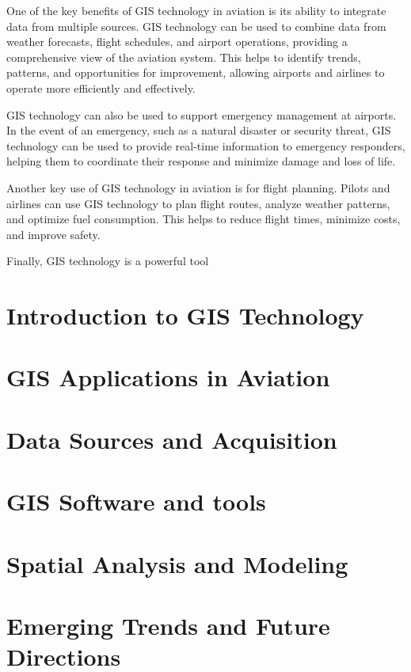 One of the key benefits of GIS technology in aviation is its ability to integrate data from multiple sources. GIS technology can be used to combine data from weather forecasts, flight schedules, and airport operations, providing a comprehensive view of the aviation system. This helps to identify trends, patterns, and opportunities for improvement, allowing airports and airlines to operate more efficiently and effectively.

GIS technology can also be used to support emergency management at airports. In the event of an emergency, such as a natural disaster or security threat, GIS technology can be used to provide real-time information to emergency responders, helping them to coordinate their response and minimize damage and loss of life.

Another key use of GIS technology in aviation is for flight planning. Pilots and airlines can use GIS technology to plan flight routes, analyze weather patterns, and optimize fuel consumption. This helps to reduce flight times, minimize costs, and improve safety.

Finally, GIS technology is a powerful tool

\section{Introduction to GIS Technology}
\section{GIS Applications in Aviation}
\section{Data Sources and Acquisition}
\section{GIS Software and tools}
\section{Spatial Analysis and Modeling}
\section{Emerging Trends and Future Directions}

